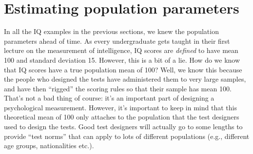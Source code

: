 \documentclass[
]{book}
\theoremstyle{definition}
\theoremstyle{definition}
\theoremstyle{definition}
\theoremstyle{definition}
\theoremstyle{remark}
\begin{document}
\hypertarget{pointestimates}{%
\section{Estimating population parameters}\label{pointestimates}}

In all the IQ examples in the previous sections, we knew the population parameters ahead of time. As every undergraduate gets taught in their first lecture on the measurement of intelligence, IQ scores are \emph{defined} to have mean 100 and standard deviation 15. However, this is a bit of a lie. How do we know that IQ scores have a true population mean of 100? Well, we know this because the people who designed the tests have administered them to very large samples, and have then ``rigged'' the scoring rules so that their sample has mean 100. That's not a bad thing of course: it's an important part of designing a psychological measurement. However, it's important to keep in mind that this theoretical mean of 100 only attaches to the population that the test designers used to design the tests. Good test designers will actually go to some lengths to provide ``test norms'' that can apply to lots of different populations (e.g., different age groups, nationalities etc.).
\end{document}
